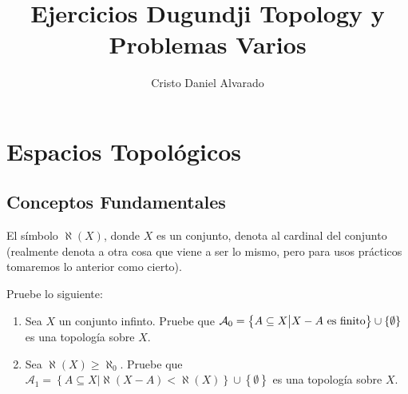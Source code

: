 \documentclass[12pt]{report}
\theoremstyle{largebreak}
\begin{document}
    \setlength{\parskip}{5pt} %
    \setlength{\parindent}{12pt} %
    \title{Ejercicios Dugundji Topology y Problemas Varios}
    \author{Cristo Daniel Alvarado}
    \maketitle

    \tableofcontents %


    \chapter{Espacios Topológicos}

    \section{Conceptos Fundamentales}

    \begin{obs}
        El símbolo $\aleph(X)$, donde $X$ es un conjunto, denota al cardinal del conjunto (realmente denota a otra cosa que viene a ser lo mismo, pero para usos prácticos tomaremos lo anterior como cierto).
    \end{obs}

    \begin{excer}
        Pruebe lo siguiente:
        \begin{enumerate}
            \item Sea $X$ un conjunto infinto. Pruebe que $\mathcal{A}_0=\left\{A\subseteq X \big|X-A\textup{ es finito} \right\}\cup\left\{\emptyset \right\}$ es una topología sobre $X$.
            \item Sea $\aleph(X)\geq\aleph_0$. Pruebe que $\mathcal{A}_1=\left\{A\subseteq X \big|\aleph(X-A)<\aleph(X) \right\}\cup\left\{\emptyset \right\}$ es una topología sobre $X$.
        \end{enumerate}
    \end{excer}
\end{document}
